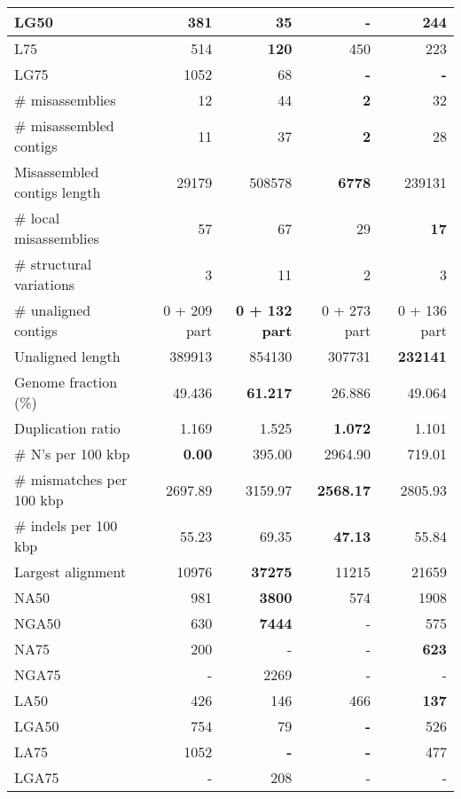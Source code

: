 \documentclass[12pt,a4paper]{article}
\begin{document}
\begin{table}[ht]
\begin{center}
\begin{tabular}{|l*{4}{|r}|}
LG50 & 381 & 35 & {\bf -} & 244 \\ \hline
L75 & 514 & {\bf 120} & 450 & 223 \\ \hline
LG75 & 1052 & 68 & {\bf -} & {\bf -} \\ \hline
\# misassemblies & 12 & 44 & {\bf 2} & 32 \\ \hline
\# misassembled contigs & 11 & 37 & {\bf 2} & 28 \\ \hline
Misassembled contigs length & 29179 & 508578 & {\bf 6778} & 239131 \\ \hline
\# local misassemblies & 57 & 67 & 29 & {\bf 17} \\ \hline
\# structural variations & 3 & 11 & 2 & 3 \\ \hline
\# unaligned contigs & 0 + 209 part & {\bf 0 + 132 part} & 0 + 273 part & 0 + 136 part \\ \hline
Unaligned length & 389913 & 854130 & 307731 & {\bf 232141} \\ \hline
Genome fraction (\%) & 49.436 & {\bf 61.217} & 26.886 & 49.064 \\ \hline
Duplication ratio & 1.169 & 1.525 & {\bf 1.072} & 1.101 \\ \hline
\# N's per 100 kbp & {\bf 0.00} & 395.00 & 2964.90 & 719.01 \\ \hline
\# mismatches per 100 kbp & 2697.89 & 3159.97 & {\bf 2568.17} & 2805.93 \\ \hline
\# indels per 100 kbp & 55.23 & 69.35 & {\bf 47.13} & 55.84 \\ \hline
Largest alignment & 10976 & {\bf 37275} & 11215 & 21659 \\ \hline
NA50 & 981 & {\bf 3800} & 574 & 1908 \\ \hline
NGA50 & 630 & {\bf 7444} & - & 575 \\ \hline
NA75 & 200 & - & - & {\bf 623} \\ \hline
NGA75 & - & 2269 & - & - \\ \hline
LA50 & 426 & 146 & 466 & {\bf 137} \\ \hline
LGA50 & 754 & 79 & {\bf -} & 526 \\ \hline
LA75 & 1052 & {\bf -} & {\bf -} & 477 \\ \hline
LGA75 & - & 208 & - & - \\ \hline
\end{tabular}
\end{center}
\end{table}
\end{document}
